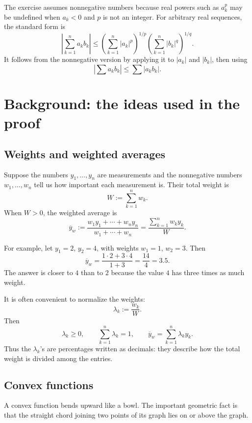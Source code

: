 \documentclass[11pt]{article}
\newcommand{\abs}[1]{\left|#1\right|}
\begin{document}
\begin{warningBox}
The exercise assumes nonnegative numbers because real powers such as \(a_k^p\) may be undefined when \(a_k<0\) and \(p\) is not an integer. For arbitrary real sequences, the standard form is
\[
 \abs{\sum_{k=1}^{n}a_kb_k}
 \leq
 \left(\sum_{k=1}^{n}\abs{a_k}^p\right)^{1/p}
 \left(\sum_{k=1}^{n}\abs{b_k}^q\right)^{1/q}.
\]
It follows from the nonnegative version by applying it to \(\abs{a_k}\) and \(\abs{b_k}\), then using
\[
 \abs{\sum a_kb_k}\leq\sum\abs{a_kb_k}.
\]
\end{warningBox}

\section{Background: the ideas used in the proof}

\subsection{Weights and weighted averages}

Suppose the numbers \(y_1,\ldots,y_n\) are measurements and the nonnegative numbers \(w_1,\ldots,w_n\) tell us how important each measurement is. Their total weight is
\[
 W:=\sum_{k=1}^{n}w_k.
 \tag{1}
\]
When \(W>0\), the weighted average is
\[
 \overline y_w
 :=\frac{w_1y_1+\cdots+w_ny_n}{w_1+\cdots+w_n}
 =\frac{\sum_{k=1}^{n}w_ky_k}{W}.
 \tag{2}
\]

For example, let \(y_1=2\), \(y_2=4\), with weights \(w_1=1\), \(w_2=3\). Then
\[
 \overline y_w=\frac{1\cdot2+3\cdot4}{1+3}=\frac{14}{4}=3.5.
\]
The answer is closer to \(4\) than to \(2\) because the value \(4\) has three times as much weight.

It is often convenient to normalize the weights:
\[
 \lambda_k:=\frac{w_k}{W}.
 \tag{3}
\]
Then
\[
 \lambda_k\geq0,
 \qquad
 \sum_{k=1}^{n}\lambda_k=1,
 \qquad
 \overline y_w=\sum_{k=1}^{n}\lambda_ky_k.
 \tag{4}
\]
Thus the \(\lambda_k\)'s are percentages written as decimals: they describe how the total weight is divided among the entries.

\subsection{Convex functions}

A convex function bends upward like a bowl. The important geometric fact is that the straight chord joining two points of its graph lies on or above the graph.
\end{document}
